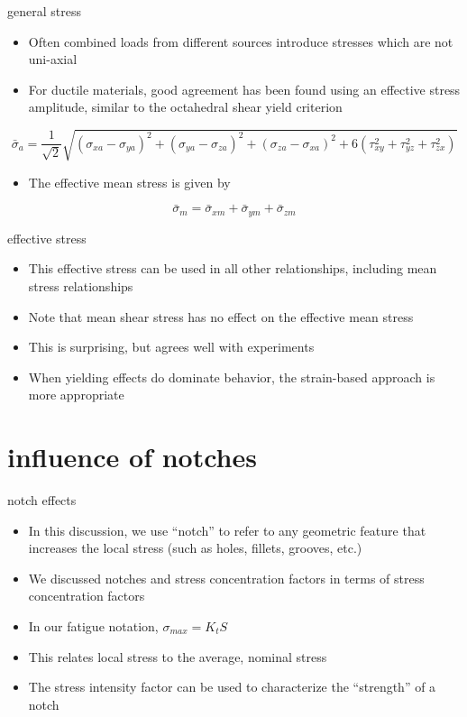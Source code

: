 \documentclass[
  letterpaper,
  ignorenonframetext,
  aspectratio=43,
  handout,
  12pt]{beamer}
\providecommand{\tightlist}{%
  \setlength{\itemsep}{0pt}\setlength{\parskip}{0pt}}
\providecommand{\tightlist}{%
\setlength{\itemsep}{0pt}\setlength{\parskip}{0pt}}
\begin{document}
\begin{frame}{general stress}
\protect\hypertarget{general-stress-1}{}
\begin{itemize}
\tightlist
\item
  Often combined loads from different sources introduce stresses which
  are not uni-axial
\item
  For ductile materials, good agreement has been found using an
  effective stress amplitude, similar to the octahedral shear yield
  criterion
\end{itemize}

\[\bar{\sigma}_a = \frac{1}{\sqrt{2}}\sqrt{(\sigma_{xa}-\sigma_{ya})^2 + (\sigma_{ya}-\sigma_{za})^2 + (\sigma_{za}-\sigma_{xa})^2 + 6(\tau_{xy}^2 + \tau_{yz}^2 + \tau_{zx}^2)}\]

\begin{itemize}
\tightlist
\item
  The effective mean stress is given by
\end{itemize}

\[\bar{\sigma}_m = \bar{\sigma}_{xm} + \bar{\sigma}_{ym} + \bar{\sigma}_{zm}\]
\end{frame}

\begin{frame}{effective stress}
\protect\hypertarget{effective-stress}{}
\begin{itemize}
\tightlist
\item
  This effective stress can be used in all other relationships,
  including mean stress relationships
\item
  Note that mean shear stress has no effect on the effective mean stress
\item
  This is surprising, but agrees well with experiments
\item
  When yielding effects do dominate behavior, the strain-based approach
  is more appropriate
\end{itemize}
\end{frame}

\hypertarget{influence-of-notches}{%
\section{influence of notches}\label{influence-of-notches}}

\begin{frame}{notch effects}
\protect\hypertarget{notch-effects}{}
\begin{itemize}
\tightlist
\item
  In this discussion, we use ``notch'' to refer to any geometric feature
  that increases the local stress (such as holes, fillets, grooves,
  etc.)
\item
  We discussed notches and stress concentration factors in terms of
  stress concentration factors
\item
  In our fatigue notation, \(\sigma_{max} = K_t S\)
\item
  This relates local stress to the average, nominal stress
\item
  The stress intensity factor can be used to characterize the
  ``strength'' of a notch
\end{itemize}
\end{frame}
\end{document}
